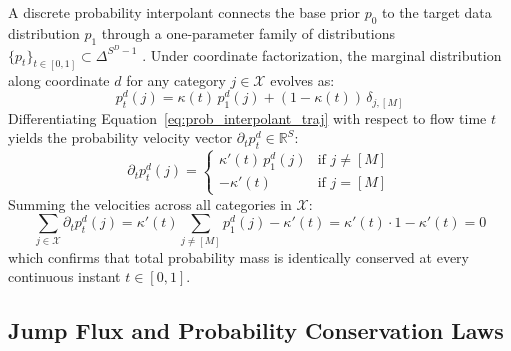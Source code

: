 A discrete probability interpolant connects the base prior $p_0$ to the target data distribution $p_1$ through a one-parameter family of distributions $\{p_t\}_{t \in [0, 1]} \subset \Delta^{S^D - 1}$ \citep{Campbell2024, Gat2024, Stark2024}. Under coordinate factorization, the marginal distribution along coordinate $d$ for any category $j \in \mathcal{X}$ evolves as:
\begin{equation}
p_t^d(j) = \kappa(t) \, p_1^d(j) + (1 - \kappa(t)) \, \delta_{j, [M]}
\label{eq:prob_interpolant_traj}
\end{equation}
Differentiating Equation~\ref{eq:prob_interpolant_traj} with respect to flow time $t$ yields the probability velocity vector $\partial_t p_t^d \in \mathbb{R}^S$:
\begin{equation}
\partial_t p_t^d(j) = 
\begin{cases}
\kappa'(t) \, p_1^d(j) & \text{if } j \ne [M] \\[6pt]
-\kappa'(t) & \text{if } j = [M]
\end{cases}
\label{eq:prob_velocity_field}
\end{equation}
Summing the velocities across all categories in $\mathcal{X}$:
\begin{equation}
\sum_{j \in \mathcal{X}} \partial_t p_t^d(j) = \kappa'(t) \sum_{j \ne [M]} p_1^d(j) - \kappa'(t) = \kappa'(t) \cdot 1 - \kappa'(t) = 0
\label{eq:velocity_sum_zero}
\end{equation}
which confirms that total probability mass is identically conserved at every continuous instant $t \in [0, 1]$.

\subsection{Jump Flux and Probability Conservation Laws}

